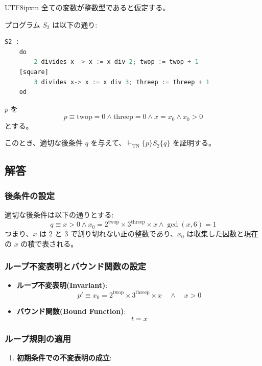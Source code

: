\documentclass[12pt,a4paper]{article}
\begin{document}
\begin{CJK}{UTF8}{ipxm}
全ての変数が整数型であると仮定する。

プログラム $S_2$ は以下の通り:

\begin{lstlisting}[language=Python]
S2 :
    do
        2 divides x -> x := x div 2; twop := twop + 1
    [square]
        3 divides x-> x := x div 3; threep := threep + 1
    od
\end{lstlisting}

$p$ を
\[
p \equiv \text{twop} = 0 \land \text{threep} = 0 \land x = x_0 \land x_0 > 0
\]
とする。

このとき、適切な後条件 $q$ を与えて、$\vdash_{\text{TN}} \{ p \} S_2 \{ q \}$ を証明する。

\subsection*{解答}

\subsubsection*{後条件の設定}

適切な後条件は以下の通りとする:
\[
q \equiv x > 0 \land x_0 = 2^{\text{twop}} \times 3^{\text{threep}} \times x \land \gcd(x, 6) = 1
\]
つまり、$x$ は $2$ と $3$ で割り切れない正の整数であり、$x_0$ は収集した因数と現在の $x$ の積で表される。

\subsubsection*{ループ不変表明とバウンド関数の設定}

\begin{itemize}
    \item \textbf{ループ不変表明(Invariant)}:
    \[
    p' \equiv x_0 = 2^{\text{twop}} \times 3^{\text{threep}} \times x \quad \land \quad x > 0
    \]
    \item \textbf{バウンド関数(Bound Function)}:
    \[
    t = x
    \]
\end{itemize}

\subsubsection*{ループ規則の適用}

\begin{enumerate}
    \item \textbf{初期条件での不変表明の成立}:


\end{enumerate}
\end{CJK}
\end{document}
